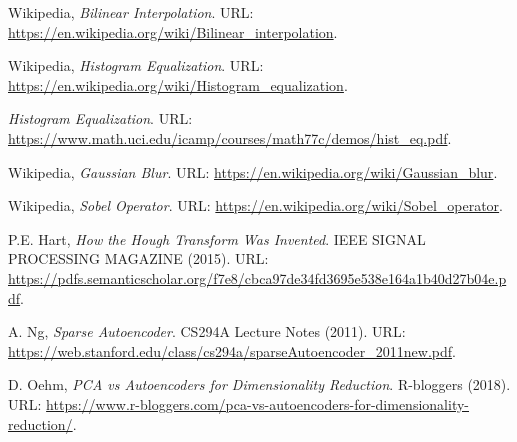 \begin{thebibliography}{3}
Wikipedia,
\emph{Bilinear Interpolation}.
URL: \url{https://en.wikipedia.org/wiki/Bilinear_interpolation}.

Wikipedia,
\emph{Histogram Equalization}.
URL: \url{https://en.wikipedia.org/wiki/Histogram_equalization}.


\emph{Histogram Equalization}.
URL: \url{https://www.math.uci.edu/icamp/courses/math77c/demos/hist_eq.pdf}.


Wikipedia,
\emph{Gaussian Blur}.
URL: \url{https://en.wikipedia.org/wiki/Gaussian_blur}.


Wikipedia,
\emph{Sobel Operator}.
URL: \url{https://en.wikipedia.org/wiki/Sobel_operator}.


P.E. Hart,
\emph{How the Hough Transform Was Invented}.
IEEE SIGNAL PROCESSING MAGAZINE
(2015).
URL: \url{https://pdfs.semanticscholar.org/f7e8/cbca97de34fd3695e538e164a1b40d27b04e.pdf}.




A. Ng,
\emph{Sparse Autoencoder}.
CS294A Lecture Notes
(2011).
URL: \url{https://web.stanford.edu/class/cs294a/sparseAutoencoder_2011new.pdf}.





D. Oehm,
\emph{PCA vs Autoencoders for Dimensionality Reduction}.
R-bloggers
(2018).
URL: \url{https://www.r-bloggers.com/pca-vs-autoencoders-for-dimensionality-reduction/}.



\end{thebibliography}
